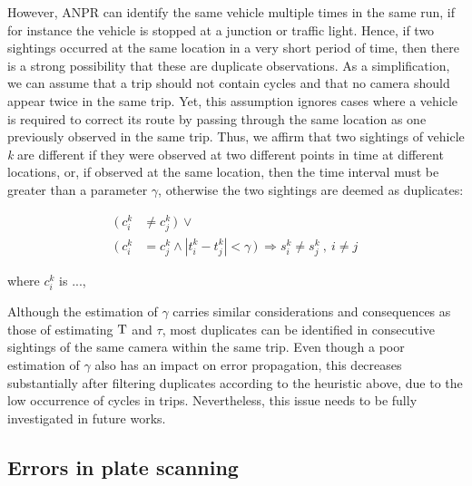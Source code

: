 However, ANPR can identify the same vehicle multiple times in the same run, if for instance the vehicle is stopped at a junction or traffic light. Hence, if two sightings occurred at the same location in a very short period of time, then there is a strong possibility that these are duplicate observations. As a simplification, we can assume that a trip should not contain cycles and that no camera should appear twice in the same trip. Yet, this assumption ignores cases where a vehicle is required to correct its route by passing through the same location as one previously observed in the same trip. Thus, we affirm that two sightings of vehicle \emph{k} are different if they were observed at two different points in time at different locations, or, if observed at the same location, then the time interval must be greater than a parameter $\gamma$, otherwise the two sightings are deemed as duplicates:


\begin{align} \label{e.sighting.different.2}
 (\ c^{k}_{i} &\ne c^{k}_{j} \, )\ \vee \\
 (\ c^{k}_{i} &= c^{k}_{j} \wedge |t^{k}_{i} - t^{k}_{j}| < \gamma \, )\ \Rightarrow s^{k}_{i} \ne s^{k}_{j}  \ , \ i \ne j \nonumber
\end{align}

{\color{blue}where $c_i^k$ is ..., }

 Although the estimation of $\gamma$ carries similar considerations and consequences as those of estimating $\mathrm{T}$ and $\tau$, most duplicates can be identified in consecutive sightings of the same camera within the same trip. Even though a poor estimation of $\gamma$ also has an impact on error propagation, this decreases substantially after filtering duplicates according to the heuristic above, due to the low occurrence of cycles in trips. Nevertheless, this issue needs to be fully investigated in future works.

\subsection{Errors in plate scanning}

